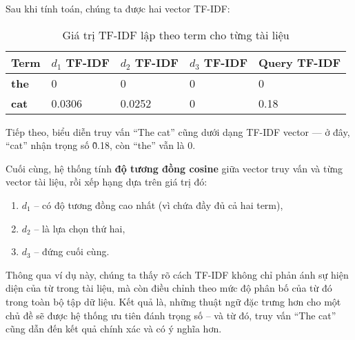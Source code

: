 Sau khi tính toán, chúng ta được hai vector TF-IDF:

\begin{table}[H]
    \centering
    \caption{Giá trị TF-IDF lập theo term cho từng tài liệu}
    \begin{tabularx}{\linewidth}{l || X X X l}
        \toprule
        \textbf{Term} & \textbf{\(d_1\) TF-IDF} & \textbf{\(d_2\) TF-IDF} & \textbf{\(d_3\) TF-IDF} & \textbf{Query TF-IDF} \\
        \midrule\midrule
        \textbf{the}  & 0                       & 0                       & 0                       & 0                     \\
        \textbf{cat}  & 0.0306                  & 0.0252                  & 0                       & 0.18                  \\
        \bottomrule
    \end{tabularx}
\end{table}

Tiếp theo, biểu diễn truy vấn ``The cat'' cũng dưới dạng TF-IDF vector — ở đây, ``cat'' nhận trọng số \~0.18, còn ``the'' vẫn là 0.

Cuối cùng, hệ thống tính \textbf{độ tương đồng cosine} giữa vector truy vấn và từng vector tài liệu, rồi xếp hạng dựa trên giá trị đó:

\begin{enumerate}
    \item \(d_{1}\) -- có độ tương đồng cao nhất (vì chứa đầy đủ cả hai term),
    \item \(d_{2}\) -- là lựa chọn thứ hai,
    \item \(d_{3}\) -- đứng cuối cùng.
\end{enumerate}

Thông qua ví dụ này, chúng ta thấy rõ cách TF-IDF không chỉ phản ánh sự hiện diện của từ trong tài liệu, mà còn điều chỉnh theo mức độ phân bố của từ đó trong toàn bộ tập dữ liệu. Kết quả là, những thuật ngữ đặc trưng hơn cho một chủ đề sẽ được hệ thống ưu tiên đánh trọng số -- và từ đó, truy vấn ``The cat'' cũng dẫn đến kết quả chính xác và có ý nghĩa hơn.
